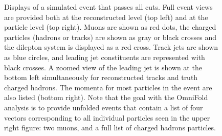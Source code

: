 \begin{figure}[h!]
  \caption{Displays of a simulated event that passes all cuts. Full event views are provided both at the reconstructed level (top left) and at the particle level (top right).
    Muons are shown as red dots, the charged particles (hadrons or tracks) are shown as gray or black crosses and the dilepton system is displayed as a red cross.
    Track jets are shown as blue circles, and leading jet constituents are represented with black crosses.
    A zoomed view of the leading jet is shown at the bottom left simultaneously for reconstructed tracks and truth charged hadrons. The momenta for most particles in the event are also listed (bottom right).
    Note that the goal with the OmniFold analysis is to provide unfolded events that contain a list of four vectors corresponding to all individual particles seen in the upper right figure: two muons, and a full list of charged hadrons particles.}
  \label{fig:EventDisplay}
\end{figure}

\clearpage
